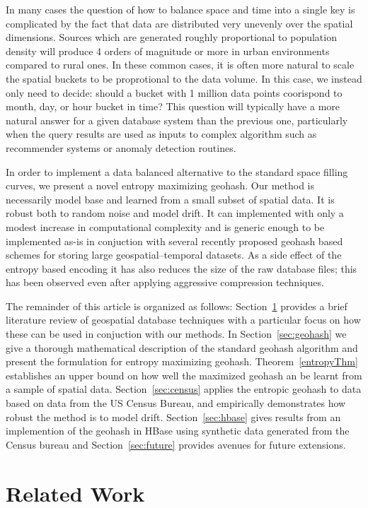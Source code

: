 \documentclass[nips13submit_09,times,art10]{article} %
\begin{document}
In many cases the question of how to balance space and time into a single key is complicated
by the fact that data are distributed very unevenly over the spatial dimensions. Sources
which are generated roughly proportional to population density will produce 4 orders of
magnitude or more in urban environments compared to rural ones. In these common cases, it
is often more natural to scale the spatial buckets to be proprotional to the data volume.
In this case, we instead only need to decide: should a bucket with 1 million data points
coorispond to month, day, or hour bucket in time? This question will typically have a more
natural answer for a given database system than the previous one, particularly when the
query results are used as inputs to complex algorithm such as recommender systems or
anomaly detection routines.

In order to implement a data balanced alternative to the standard space filling curves,
we present a novel entropy maximizing geohash. Our method is necessarily model base and
learned from a small subset of spatial data. It is robust both to random noise and
model drift. It can implemented with only a modest increase in computational complexity
and is generic enough to be implemented as-is in conjuction with several recently
proposed geohash based schemes for storing large geospatial--temporal datasets. As a
side effect of the entropy based encoding it has also reduces the size of the raw database
files; this has been observed even after applying aggressive compression techniques.

The remainder of this article is organized as follows: Section~\ref{sec:related}
provides a brief literature review of geospatial database techniques with a particular
focus on how these can be used in conjuction with our methods.
In Section~\ref{sec:geohash} we give a thorough mathematical description of the standard
geohash algorithm and present the formulation for entropy maximizing geohash.
Theorem~\ref{entropyThm} establishes an upper bound on how well the maximized geohash
an be learnt from a sample of spatial data. Section~\ref{sec:census} applies the
entropic geohash to data based on data from the US Census Bureau, and empirically
demonstrates how robust the method is to model drift.
Section~\ref{sec:hbase} gives results from an implemention of the geohash in HBase
using synthetic data generated from the Census bureau and Section~\ref{sec:future}
provides avenues for future extensions.

\section{Related Work} \label{sec:related}
\end{document}

